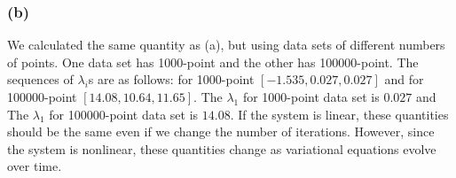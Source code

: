 \documentclass{article}
\begin{document}
\subsubsection*{(b)}
We calculated the same quantity as (a), but using data sets of different numbers of points. One data set has 1000-point and the other has 100000-point. The sequences of $\lambda_{i}$s are as follows: for 1000-point $[-1.535,  0.027,  0.027]$ and for 100000-point $[14.08,  10.64,  11.65]$. The $\lambda_{1}$ for 1000-point data set is $0.027$ and The $\lambda_{1}$ for 100000-point data set is $14.08$. If the system is linear, these quantities should be the same even if we change the number of iterations. However, since the system is nonlinear, these quantities change as variational equations evolve over time.
\end{document}
